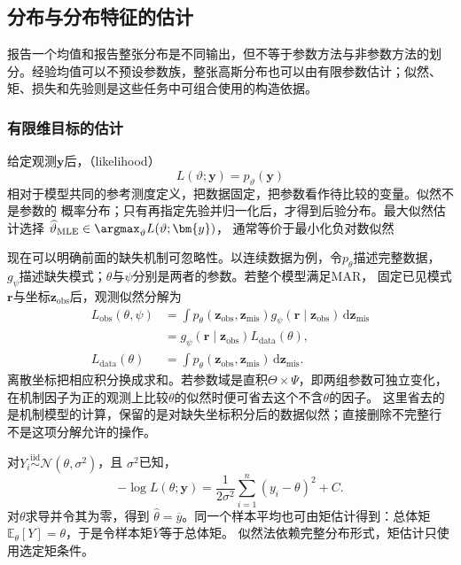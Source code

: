 \subsection{分布与分布特征的估计}
\label{sec:stats-parameter-inference-efficiency}
报告一个均值和报告整张分布是不同输出，但不等于参数方法与非参数方法的划分。经验均值可以不预设参数族，整张高斯分布也可以由有限参数估计；似然、矩、损失和先验则是这些任务中可组合使用的构造依据。

\subsubsection{有限维目标的估计}
\label{sec:statistics-likelihood-robustness}
\label{sec:statistics-bayes-hierarchy}
给定观测\(\bm{y}\)后，（likelihood）
\[
  L(\vartheta;\bm{y})=p_\vartheta(\bm{y})
\]
相对于模型共同的参考测度定义，把数据固定，把参数看作待比较的变量。似然不是参数的
概率分布；只有再指定先验并归一化后，才得到后验分布。最大似然估计选择
\(\widehat\vartheta_{\mathrm{MLE}}\in\argmax_\vartheta L(\vartheta;\bm{y})\)，
通常等价于最小化负对数似然

现在可以明确前面的缺失机制可忽略性。以连续数据为例，令\(p_\theta\)描述完整数据，
\(g_\psi\)描述缺失模式；\(\theta\)与\(\psi\)分别是两者的参数。若整个模型满足MAR，
固定已见模式\(\bm r\)与坐标\(\bm z_{\mathrm{obs}}\)后，观测似然分解为
\begin{equation}
\begin{aligned}
 L_{\mathrm{obs}}(\theta,\psi)
 &=\int p_\theta(\bm z_{\mathrm{obs}},\bm z_{\mathrm{mis}})
       g_\psi(\bm r\mid\bm z_{\mathrm{obs}})\,\mathrm d\bm z_{\mathrm{mis}}\\
 &=g_\psi(\bm r\mid\bm z_{\mathrm{obs}})
       L_{\mathrm{data}}(\theta),\\
 L_{\mathrm{data}}(\theta)
 &=\int p_\theta(\bm z_{\mathrm{obs}},\bm z_{\mathrm{mis}})
       \,\mathrm d\bm z_{\mathrm{mis}}.
\end{aligned}
\label{eq:statistics-missing-likelihood}
\end{equation}
离散坐标把相应积分换成求和。若参数域是直积\(\Theta\times\Psi\)，即两组参数可独立变化，
在机制因子为正的观测上比较\(\theta\)的似然时便可省去这个不含\(\theta\)的因子。
这里省去的是机制模型的计算，保留的是对缺失坐标积分后的数据似然；直接删除不完整行
不是这项分解允许的操作。

对\(Y_i\overset{\mathrm{iid}}{\sim}\mathcal{N}(\theta,\sigma^2)\)，且
\(\sigma^2\)已知，
\[
  -\log L(\theta;\bm{y})
  =\frac{1}{2\sigma^2}\sum_{i=1}^n(y_i-\theta)^2+C.
\]
对\(\theta\)求导并令其为零，得到
\(\widehat\theta=\overline y\)。同一个样本平均也可由矩估计得到：总体矩
\(\mathbb{E}_\theta[Y]=\theta\)，于是令样本矩\(\overline Y\)等于总体矩。
似然法依赖完整分布形式，矩估计只使用选定矩条件。

